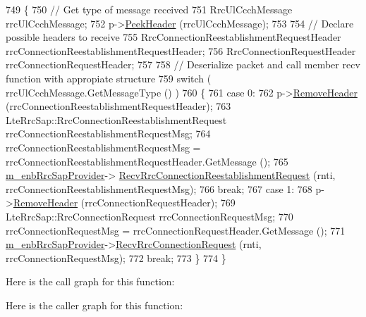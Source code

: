 \begin{DoxyCode}
749 \{
750   \textcolor{comment}{// Get type of message received}
751   RrcUlCcchMessage rrcUlCcchMessage;
752   p->\hyperlink{classns3_1_1Packet_aadc63487bea70945c418f4c3e9b81964}{PeekHeader} (rrcUlCcchMessage);
753 
754   \textcolor{comment}{// Declare possible headers to receive}
755   RrcConnectionReestablishmentRequestHeader rrcConnectionReestablishmentRequestHeader;
756   RrcConnectionRequestHeader rrcConnectionRequestHeader;
757 
758   \textcolor{comment}{// Deserialize packet and call member recv function with appropiate structure}
759   \textcolor{keywordflow}{switch} ( rrcUlCcchMessage.GetMessageType () )
760     \{
761     \textcolor{keywordflow}{case} 0:
762       p->\hyperlink{classns3_1_1Packet_a0961eccf975d75f902d40956c93ba63e}{RemoveHeader} (rrcConnectionReestablishmentRequestHeader);
763       LteRrcSap::RrcConnectionReestablishmentRequest rrcConnectionReestablishmentRequestMsg;
764       rrcConnectionReestablishmentRequestMsg = rrcConnectionReestablishmentRequestHeader.GetMessage ();
765       \hyperlink{classns3_1_1LteEnbRrcProtocolReal_a92e8443c2bba64b254a53d95b495fb39}{m\_enbRrcSapProvider}->
      \hyperlink{classns3_1_1LteEnbRrcSapProvider_a205d3d264d52fa434896589d48d8210e}{RecvRrcConnectionReestablishmentRequest} (rnti,
      rrcConnectionReestablishmentRequestMsg);
766       \textcolor{keywordflow}{break};
767     \textcolor{keywordflow}{case} 1:
768       p->\hyperlink{classns3_1_1Packet_a0961eccf975d75f902d40956c93ba63e}{RemoveHeader} (rrcConnectionRequestHeader);
769       LteRrcSap::RrcConnectionRequest rrcConnectionRequestMsg;
770       rrcConnectionRequestMsg = rrcConnectionRequestHeader.GetMessage ();
771       \hyperlink{classns3_1_1LteEnbRrcProtocolReal_a92e8443c2bba64b254a53d95b495fb39}{m\_enbRrcSapProvider}->\hyperlink{classns3_1_1LteEnbRrcSapProvider_a6a49a245760fe748a1e959e92c9cc313}{RecvRrcConnectionRequest} (rnti,
      rrcConnectionRequestMsg);
772       \textcolor{keywordflow}{break};
773     \}
774 \}
\end{DoxyCode}


Here is the call graph for this function\+:




Here is the caller graph for this function\+:


